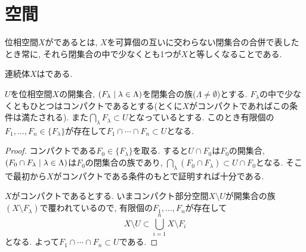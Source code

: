 \documentclass[uplatex, dvipdfmx, a4paper, 12pt, class=jsbook, crop=false]{standalone}
\begin{document}
\section{\sigmaConnected 空間}
\label{sec:sigma-connected-spaces}

\newcommand{\loclabel}[1]{\label{LocalLabel-\thepart-\thechapter-\thesection:#1}}
\newcommand{\locref}[1]{\ref{LocalLabel-\thepart-\thechapter-\thesection:#1}}

\begin{definition}
	位相空間$ X $がであるとは, $ X $を可算個の互いに交わらない閉集合の合併で表したとき常に, それら閉集合の中で少なくとも1つが$ X $と等しくなることである.
\end{definition}

\begin{theorem}
	\label{thm:Sierpinski_continuum}
	連続体$X$は\sigmaConnected である.
\end{theorem}

\begin{lemma}
	\loclabel{lemma:1}
	$ U $を位相空間$ X $の開集合, $ \setfamily{F_\lambda}{\lambda \in \Lambda} $を閉集合の族($ \Lambda \neq \emptyset $)とする. $ F_\lambda $の中で少なくともひとつはコンパクトであるとする(とくに$ X $がコンパクトであればこの条件は満たされる). また$ \bigcap_{\lambda} F_\lambda \subset U$となっているとする. このとき有限個の$ F_1, \ldots , F_n \in \{ F_\lambda\}$が存在して$ F_1 \cap \cdots \cap F_n \subset U $となる.
\end{lemma}
\begin{proof}
	コンパクトである$ F_0 \in \{F_\lambda\}$を取る. すると$ U \cap F_0 $は$ F_0 $の開集合, $ \setfamily{F_0 \cap F_\lambda}{\lambda \in \Lambda} $は$ F_0 $の閉集合の族であり, $ \bigcap_{\lambda} (F_0 \cap F_\lambda) \subset U \cap F_0 $となる. そこで最初から$ X $がコンパクトである条件のもとで証明すれば十分である.
	
	$ X $がコンパクトであるとする. いまコンパクト部分空間$ X \setminus U $が開集合の族$ (X \setminus F_\lambda) $で覆われているので, 有限個の$ F_1, \ldots, F_n $が存在して
	\[ X \setminus U \subset \bigcup_{i=1}^{n} X \setminus F_i \]
	となる. よって$ F_1 \cap \cdots \cap F_n \subset U $である.
\end{proof}
\end{document}
